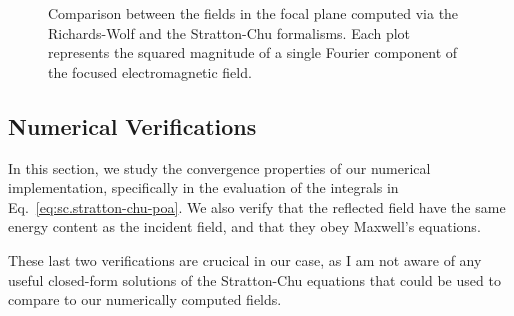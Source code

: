 \documentclass[11pt,SymmetricalJury]{inrsthesis/inrsthesis}
\begin{document}
\begin{figure}
\caption[Richards-Wolf vs Stratton-Chu: fields in the focal plane, VSF.LIN.G.f0.00875.]
        {Comparison between the fields in the focal plane computed via
        the Richards-Wolf and the Stratton-Chu formalisms. Each plot represents
        the squared magnitude of a single Fourier component of the focused
        electromagnetic field.}
\label{fig:sc.sc-vs-rw-vsf-lin-g-f0.0875}
\end{figure}



\subsection{Numerical Verifications}

In this section, we study the convergence properties of our numerical implementation,
specifically in the evaluation of the integrals in Eq.~\eqref{eq:sc.stratton-chu-poa}.
We also verify that the reflected field have the same energy content as the incident
field, and that they obey Maxwell's equations.

These last two verifications are crucical in our case, as I am not aware of any
useful closed-form solutions of the Stratton-Chu equations that could be used
to compare to our numerically computed fields.
\end{document}
